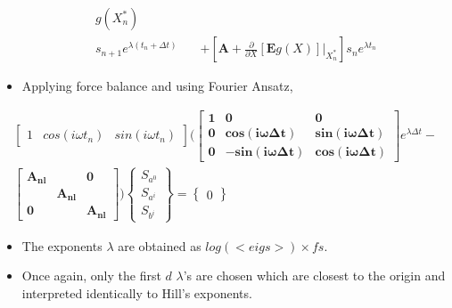 \documentclass[aspectratio=169]{beamer}
\begin{document}
\begin{frame}[allowframebreaks]
\begin{itemize}
\begin{align}
                         g(X^*_n)\nonumber\\
      s_{n+1}e^{\lambda (t_n+\Delta t)}\quad & + \left[ \mathbf{A} +
                                                   \frac{\partial}{\partial
                                                   X}[\mathbf{E}g(X)]\biggr\rvert_{X^*_n}
                                                   \right]s_n
                                               e^{\lambda t_n}
    \end{align}
  \item Applying force balance and using Fourier Ansatz,
  \end{itemize}
  {\small
    \begin{align}
      \begin{bmatrix}1& cos(i\omega t_n)& sin(i\omega
        t_n)\end{bmatrix}\biggl( \begin{bmatrix} \bm{1} & \bm{0} &
        \bm{0}\\\bm{0} & \bm{cos(i\omega\Delta t)} &
        \bm{sin(i\omega\Delta t)}\\ \bm{0} & -\bm{sin(i\omega\Delta
          t)} & \bm{cos(i\omega\Delta
          t)} \end{bmatrix}e^{\lambda\Delta t} -\nonumber\\
      \begin{bmatrix}\bm{A_{nl}}&&\bm{0} \\& \bm{A_{nl}}\\ \bm{0}&&
        \bm{A_{nl}} \end{bmatrix} \biggr) \begin{Bmatrix}S_{a^0}\\ 
        S_{a^i}\\ S_{b^i}\end{Bmatrix} = \begin{Bmatrix} 0 \end{Bmatrix} 
    \end{align}}
  \begin{itemize}
  \item The exponents $\lambda$ are obtained as $log(<eigs>)\times
    fs$.
  \item Once again, only the first $d$ $\lambda$'s are chosen which
    are closest to the origin and interpreted identically to Hill's
    exponents.
  \end{itemize}
\end{frame}
\end{document}
